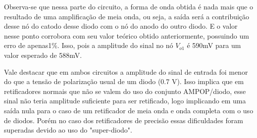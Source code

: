 Observa-se que nessa parte do circuito, a forma de onda obtida é nada mais que o resultado de uma amplificação de meia onda, ou seja, a saída será a contribuição desse nó do catodo desse diodo com o nó do anodo do outro diodo. E o valor nesse ponto corrobora com seu valor teórico obtido anteriormente, possuindo um erro de apenas1\%. Isso, pois a amplitude do sinal no nó $V_{o1}$ é 590mV para um valor esperado de 588mV. 


Vale destacar que em ambos circuitos a amplitude do sinal de entrada foi menor do que a tensão de polarização usual de um diodo (0.7 V). Isso implica que em retificadores normais que não se valem do uso do conjunto AMPOP/diodo, esse sinal não teria amplitude suficiente para ser retificado, logo implicando em uma saída nula para o caso de um retificador de meia onda e onda completa com o uso de diodos. Porém no caso dos retificadores de precisão essas dificuldades foram superadas devido ao uso do "super-diodo".

\newpage